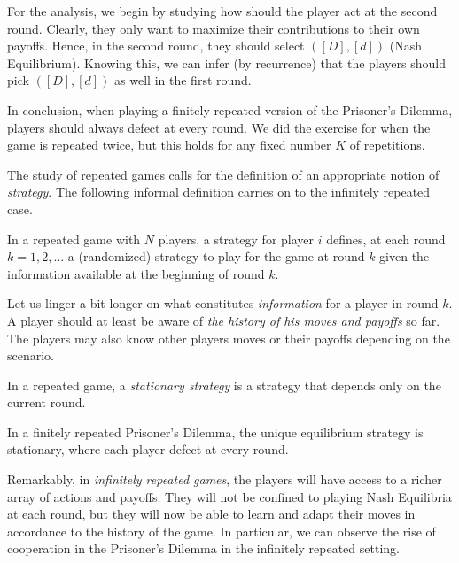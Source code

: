 \begin{example}
For the analysis, we begin by studying how should the player act at the
second round. Clearly, they only want to maximize their contributions to
their own payoffs. Hence, in the second round, they should select
$([D],[d])$ (Nash Equilibrium).
Knowing this, we can infer (by recurrence) that the players should pick
$([D],[d])$ as well in the first round.

In conclusion, when playing a finitely repeated version of the Prisoner's
Dilemma, players should always defect at every round.
We did the exercise for when the game is repeated twice, but this holds
for any fixed number $K$ of repetitions.
\end{example}

The study of repeated games calls for the definition of an appropriate
notion of \emph{strategy}. The following informal definition carries on
to the infinitely repeated case.
\begin{definition}
In a repeated game with $N$ players, a strategy for player $i$ defines,
at each round $k = 1, 2, \ldots$ a (randomized) strategy to play for the
game at round $k$ given the information available at the beginning of
round $k$.
\end{definition}

Let us linger a bit longer on what constitutes \emph{information} for a
player in round $k$. A player should at least be aware of
\emph{the history of his moves and payoffs} so far.
The players may also know other players moves or their payoffs depending
on the scenario.

\begin{definition}
In a repeated game, a \emph{stationary strategy} is a strategy that
depends only on the current round.
\end{definition}

\begin{proposition}
In a finitely repeated Prisoner's Dilemma, the unique equilibrium
strategy is stationary, where each player defect at every round.
\end{proposition}

Remarkably, in \emph{infinitely repeated games}, the players will have
access to a richer array of actions and payoffs. They will not be
confined to playing Nash Equilibria at each round, but they will now be
able to learn and adapt their moves in accordance to the history of the
game. In particular, we can observe the rise of cooperation in the
Prisoner's Dilemma in the infinitely repeated setting.

